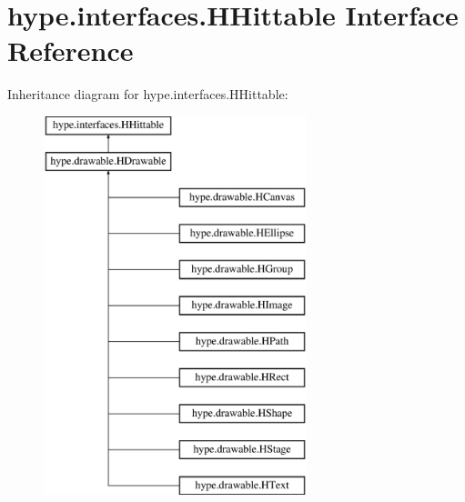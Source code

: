 \hypertarget{interfacehype_1_1interfaces_1_1_h_hittable}{\section{hype.\-interfaces.\-H\-Hittable Interface Reference}
\label{interfacehype_1_1interfaces_1_1_h_hittable}
}
Inheritance diagram for hype.\-interfaces.\-H\-Hittable\-:\begin{figure}[H]
\begin{center}
\leavevmode
\includegraphics[height=11.000000cm]{interfacehype_1_1interfaces_1_1_h_hittable}
\end{center}
\end{figure}
